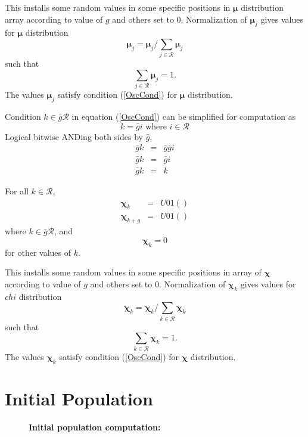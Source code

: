 This installs some random values in some specific positions in $\bm{\mu}$ distribution array according to value of $g$ and others set to $0$. 
Normalization of $\bm{\mu}_j$ gives values for $\bm{\mu}$ distribution
\[
\bm{\mu}_j = \bm{\mu}_j / \sum \limits_{j \in \mathcal{R} } \bm{\mu}_j
\]
such that 
\[
\sum \limits_{j \in \mathcal{R} } \bm{\mu}_j = 1.
\]
The values $\bm{\mu}_j$ satisfy condition (\ref{OscCond}) for $\bm{\mu}$ distribution.


Condition $k \in \bar{g} \mathcal{R}$ in equation (\ref{OscCond}) can be simplified for computation as
\[
k = \bar{g} i  \text{ where $i \in \mathcal{R}$}
\]
Logical bitwise ANDing both sides by $\bar{g}$,
\begin{eqnarray*}
\bar{g} k & = & \bar{g} \bar{g} i \\
\bar{g} k & = & \bar{g} i \\
\bar{g} k & = & k 
\end{eqnarray*}

For all $k \in \mathcal{R}$,
\begin{eqnarray*}
\bm{\chi}_k & = & U01() \\
\bm{\chi}_{k+g} & = & U01() 
\end{eqnarray*}
where $k \in \bar{g} \mathcal{R}$, and
\[
\bm{\chi}_k = 0
\]
for other values of $k$. \newline

This installs some random values in some specific positions in array of $\bm{\chi}$ according to value of $g$ 
and others set to $0$. Normalization of $\bm{\chi}_k$ gives values for $chi$ distribution 
\[
\bm{\chi}_k = \bm{\chi}_k/\sum\limits_{k \in \mathcal{R}} \bm{\chi}_k
\]
such that 
\[
\sum\limits_{k \in \mathcal{R}} \bm{\chi}_k = 1.
\]
The values $\bm{\chi}_k$ satisfy condition (\ref{OscCond}) for $\bm{\chi}$ distribution.

\section{Initial Population}
\label{InitPopOsc}

\begin{figure}[H]
\begin{center}
\hspace{5pt}
\caption{\textbf{Initial population computation:} }
\label{initalpop}
\end{center}
\end{figure}

